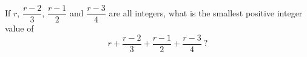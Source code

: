If $r$, $\dfrac{r-2}{3}$, $\dfrac{r-1}{2}$ and $\dfrac{r-3}{4}$ are all integers, what is the smallest positive integer value of
\[
r+\dfrac{r-2}{3}+\dfrac{r-1}{2}+\dfrac{r-3}{4}\ ?
\]
